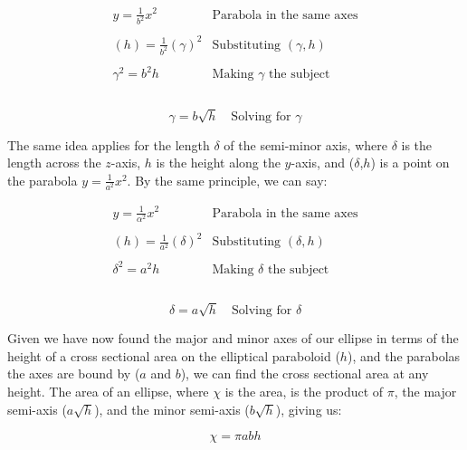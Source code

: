 \documentclass[12pt]{article}
\begin{document}
$$
\begin{array}{l|c}
    y = \frac{1}{b^2}x^2 & \text{Parabola in the same axes} \\ \\
    (h) = \frac{1}{b^2}(\gamma)^2 & \text{Substituting } (\gamma, h) \\ \\
    \gamma^2 = b^2 h & \text{Making } \gamma \text{ the subject} \\ \\
 \end{array}
$$

\begin{equation}\label{solve.gammaparab}
    \boxed{\gamma = b\sqrt{h}}  \quad \text{Solving for } \gamma
\end{equation}

The same idea applies for the length $\delta$ of the semi-minor axis, where $\delta$ is the length across the $z$-axis, $h$ is the height along the $y$-axis, and ($\delta$,$h$) is a point on the parabola $y=\frac{1}{a^2}x^2$. By the same principle, we can say:

$$
\begin{array}{l|c}
    y = \frac{1}{\alpha^2}x^2 & \text{Parabola in the same axes} \\ \\
    (h) = \frac{1}{a^2}(\delta)^2 & \text{Substituting } (\delta, h) \\ \\
    \delta^2 = a^2 h & \text{Making } \delta \text{ the subject} \\ \\
 \end{array}
$$

\begin{equation}\label{solve.delta}
    \boxed{\delta = a\sqrt{h}}  \quad \text{Solving for } \delta
\end{equation}

Given we have now found the major and minor axes of our ellipse in terms of the height of a cross sectional area on the elliptical paraboloid ($h$), and the parabolas the axes are bound by ($a$ and $b$), we can find the cross sectional area at any height. The area of an ellipse, where $\chi$ is the area, is the product of $\pi$, the major semi-axis ($a \sqrt{h}$), and the minor semi-axis ($b \sqrt{h}$), giving us:

\vspace{-8mm}

\begin{equation}\label{solve chi}
    \boxed{\chi = \pi a b h}
\end{equation}
\end{document}
